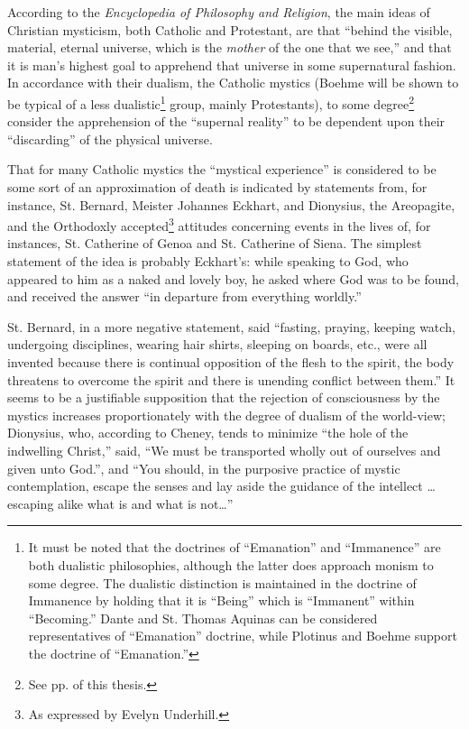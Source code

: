 According to the \emph{Encyclopedia of Philosophy and Religion},
the main ideas of Christian mysticism, both Catholic and
Protestant, are that \enquote{behind the visible, material, eternal universe,
which is the \emph{mother} of the one that we see,} and that it is
man's highest goal to apprehend that universe in some supernatural
fashion.\supercite{hastings:philosophy-religion}
In accordance with their dualism, the
Catholic mystics (Boehme will be shown to be typical of a
less dualistic\footnote{It must be noted that the doctrines of \enquote{Emanation} and \enquote{Immanence} are both dualistic philosophies, although the latter does approach monism to some degree. The dualistic distinction is maintained in the doctrine of Immanence by holding that it is \enquote{Being} which is \enquote{Immanent} within \enquote{Becoming.} Dante and St. Thomas Aquinas can be considered representatives of \enquote{Emanation} doctrine, while Plotinus and Boehme support the doctrine of \enquote{Emanation.}\supercite{underhill:mysticism}}
group, mainly Protestants), to some degree\supercite{underhill:mysticism}\footnote{See pp. \pageref{self:06} of this thesis.}
consider the apprehension of the \enquote{supernal reality} to be
dependent upon their \enquote{discarding} of the physical universe.

That for many Catholic mystics the \enquote{mystical experience}
is considered to be some sort of an approximation of death
is indicated by statements from, for instance, St. Bernard,
Meister Johannes Eckhart, and Dionysius, the Areopagite, and
the Orthodoxly accepted\footnote{As expressed by Evelyn Underhill.}
attitudes concerning events in the lives of, for instances, St. Catherine of Genoa and St. Catherine
of Siena. The simplest statement of the idea is probably
Eckhart's: while speaking to God, who appeared to him as a
naked and lovely boy, he asked where God was to be found, and
received the answer \enquote{in departure from everything worldly.}\supercite{cheney:walked-with-god}

St. Bernard, in a more negative statement, said \enquote{fasting,
praying, keeping watch, undergoing disciplines, wearing hair
shirts, sleeping on boards, etc., were all invented because
there is continual opposition of the flesh to the spirit,
the body threatens to overcome the spirit and there is unending
conflict between them.}\supercite{cheney:walked-with-god}
It seems to be a justifiable supposition that the rejection of consciousness by the mystics
increases proportionately with the degree of dualism of the
world-view; Dionysius, who, according to Cheney, tends to
minimize \enquote{the hole of the indwelling Christ,} said, \enquote{We must be
transported wholly out of ourselves and given unto God.},\supercite{underhill:mysticism}
and \enquote{You should, in the purposive practice of mystic contemplation,
escape the senses and lay aside the guidance of the
intellect \dots escaping alike what is and what is not\dots}\supercite{cheney:walked-with-god}

